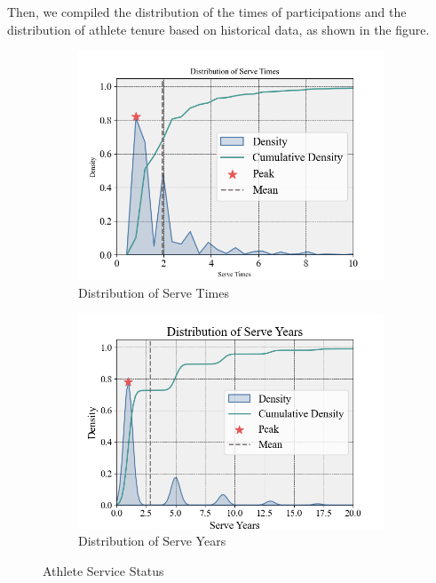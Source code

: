 \documentclass[12pt]{article}  %
\begin{document}
Then, we compiled the distribution of the times of participations and the distribution of athlete tenure based on historical data, as shown in the figure.
\begin{figure}[htbp]
	\centering
	\begin{subfigure}[b]{.48\textwidth}
		\includegraphics[width=\textwidth]{img/Times.png}
		\caption{Distribution of Serve Times}\label{subfig:left}
	\end{subfigure}
	\begin{subfigure}[b]{.51\textwidth}
		\includegraphics[width=\textwidth]{img/Years.png}
		\caption{Distribution of Serve Years}\label{subfig:right}
	\end{subfigure}
	\caption{Athlete Service Status}\label{fig:subfigures}
\end{figure}
\end{document}
